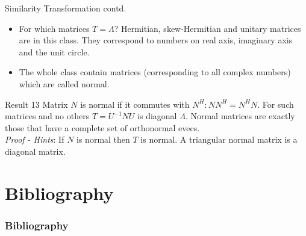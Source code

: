 \documentclass{beamer}
\begin{document}
\begin{frame}{Similarity Transformation contd.}
\begin{itemize}
    \item For which matrices $T = \Lambda$? Hermitian, skew-Hermitian and unitary matrices are in this class. They correspond to numbers on real axis, imaginary axis and the unit circle.
    \item The whole class contain matrices (corresponding to all complex numbers) which are called normal.
\end{itemize}
\begin{block}{Result 13}
Matrix $N$ is normal if it commutes with $N^H: NN^H = N^HN$. For such matrices and no others $T = U^{-1}NU$ is diagonal $\Lambda$. Normal matrices are exactly those that have a complete set of orthonormal evecs.\\
\textit{Proof - Hints}: If $N$ is normal then $T$ is normal. A triangular normal matrix is a diagonal matrix.
\end{block}
\end{frame}

\section{Bibliography}
\begin{frame}[t]
    \frametitle{Bibliography}
    \nocite{*}
    \printbibliography
\end{frame}
\end{document}
